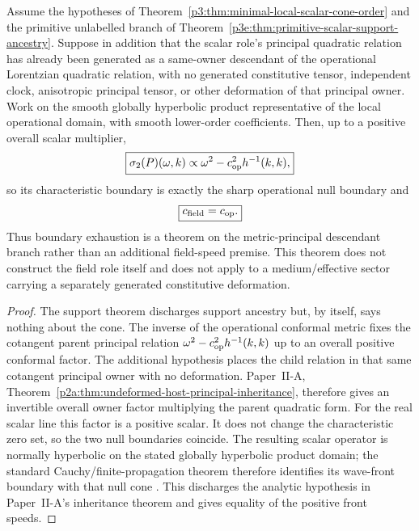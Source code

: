 \documentclass[12pt,a4paper]{article}
\begin{document}
\begin{theorem}
\label{p3e:thm:metric-principal-descendant-saturation}
Assume the hypotheses of
Theorem~\ref{p3:thm:minimal-local-scalar-cone-order} and the primitive
unlabelled branch of
Theorem~\ref{p3e:thm:primitive-scalar-support-ancestry}.  Suppose in addition
that the scalar role's principal quadratic relation has already been generated
as a same-owner descendant of the operational Lorentzian quadratic relation,
with no generated constitutive tensor, independent clock, anisotropic
principal tensor, or other deformation of that principal owner.  Work on the
smooth globally hyperbolic product representative of the local operational
domain, with smooth lower-order coefficients.  Then, up to
 a positive overall scalar multiplier,
\[
 \boxed{
 \sigma_2(P)(\omega,k)
 \propto
 \omega^2-c_{\rm op}^2h^{-1}(k,k),}
\]
so its characteristic boundary is exactly the sharp operational null boundary
and
\[
 \boxed{c_{\rm field}=c_{\rm op}.}
\]
Thus boundary exhaustion is a theorem on the metric-principal descendant
branch rather than an additional field-speed premise.  This theorem does not
construct the field role itself and does not apply to a medium/effective
sector carrying a separately generated constitutive deformation.
\end{theorem}

\begin{proof}
The support theorem discharges support ancestry but, by itself, says nothing
about the cone.  The inverse of the operational conformal metric fixes the
cotangent parent principal relation
\(\omega^2-c_{\rm op}^2h^{-1}(k,k)\) up to an overall positive conformal
factor.  The additional hypothesis places the child relation in that same
cotangent principal owner with no deformation.  Paper~II-A,
Theorem~\ref{p2a:thm:undeformed-host-principal-inheritance}, therefore gives
an invertible overall owner factor multiplying the parent quadratic form.
For the real scalar line this factor is a positive scalar.  It does not change
the characteristic zero set, so the two null boundaries coincide.  The
resulting scalar operator is normally hyperbolic on the stated globally
hyperbolic product domain; the standard Cauchy/finite-propagation theorem
therefore identifies its wave-front boundary with that null cone
\cite[Theorems~3.2.11--3.2.12]{BarGinouxPfaffle2007}.  This discharges the analytic hypothesis in
Paper~II-A's inheritance theorem and gives equality of the positive front
speeds.
\end{proof}
\end{document}
